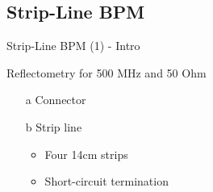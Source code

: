 \documentclass{beamer}
\begin{document}
\subsection{Strip-Line BPM}
\begin{frame}[t,fragile]{Strip-Line BPM (1) - Intro}

Reflectometry for 500 MHz and 50 Ohm
\begin{itemize}
\item[a] Connector
\item[b] Strip line
\begin{itemize}
\item Four 14cm strips
\item Short-circuit termination
\end{itemize}
\end{itemize}

\begin{figure}
  \centering
  \quad
\end{figure}

\end{frame}
\end{document}
